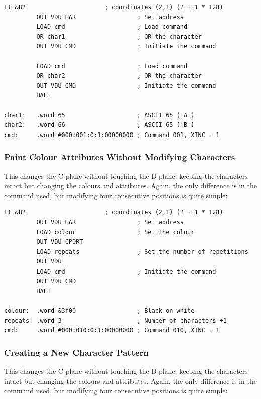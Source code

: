 \begin{lstlisting}[language=cftasm]
         LI &82                      ; coordinates (2,1) (2 + 1 * 128)
         OUT VDU HAR                 ; Set address
         LOAD cmd                    ; Load command
         OR char1                    ; OR the character
         OUT VDU CMD                 ; Initiate the command

         LOAD cmd                    ; Load command
         OR char2                    ; OR the character
         OUT VDU CMD                 ; Initiate the command
         HALT

char1:   .word 65                    ; ASCII 65 ('A')
char2:   .word 66                    ; ASCII 65 ('B')
cmd:     .word #000:001:0:1:00000000 ; Command 001, XINC = 1
\end{lstlisting}


\subsubsection{Paint Colour Attributes Without Modifying Characters}

This changes the C plane without touching the B plane, keeping the characters
intact but changing the colours and attributes. Again, the only difference is
in the command used, but modifying four consecutive positions is quite simple:

\begin{lstlisting}[language=cftasm]
         LI &82                      ; coordinates (2,1) (2 + 1 * 128)
         OUT VDU HAR                 ; Set address
         LOAD colour                 ; Set the colour
         OUT VDU CPORT
         LOAD repeats                ; Set the number of repetitions
         OUT VDU
         LOAD cmd                    ; Initiate the command
         OUT VDU CMD
         HALT

colour:  .word &3f00                 ; Black on white
repeats: .word 3                     ; Number of characters +1
cmd:     .word #000:010:0:1:00000000 ; Command 010, XINC = 1
\end{lstlisting}



\subsubsection{Creating a New Character Pattern}

This changes the C plane without touching the B plane, keeping the characters
intact but changing the colours and attributes. Again, the only difference is
in the command used, but modifying four consecutive positions is quite simple:

